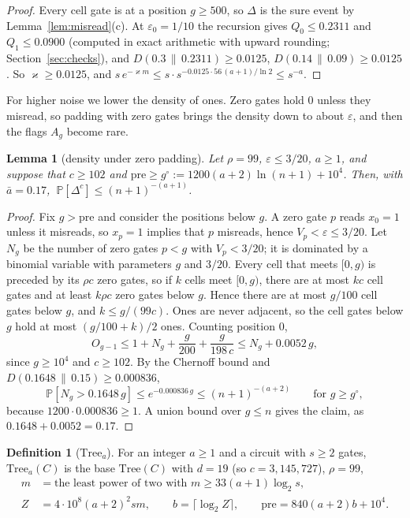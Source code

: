 \documentclass[11pt]{amsart}
\newtheorem{lemma}[theorem]{Lemma}
\theoremstyle{definition}
\newtheorem{definition}[theorem]{Definition}
\theoremstyle{remark}
\newcommand{\eps}{\varepsilon}
\newcommand{\PP}{\mathbb{P}}
\begin{document}
\begin{proof}
Every cell gate is at a position $g\ge500$, so $\Delta$ is the sure event by
Lemma~\ref{lem:misread}(c). At $\eps_0=1/10$ the recursion gives $Q_0\le0.2311$ and
$Q_1\le0.0900$ (computed in exact arithmetic with upward rounding; Section~\ref{sec:checks}), and
$D(0.3\,\|\,0.2311)\ge0.0125$, $D(0.14\,\|\,0.09)\ge0.0125$. So $\varkappa\ge0.0125$, and
$s\,e^{-\varkappa m}\le s\cdot s^{-0.0125\cdot56\,(a+1)/\ln2}\le s^{-a}$.
\end{proof}

For higher noise we lower the density of ones. Zero gates hold $0$ unless they misread, so padding
with zero gates brings the density down to about $\eps$, and then the flags $A_g$ become rare.

\begin{lemma}[density under zero padding]\label{lem:zeropad}
Let $\rho=99$, $\eps\le3/20$, $a\ge1$, and suppose that $c\ge102$ and
$\mathrm{pre}\ge g^\circ:=1200(a+2)\ln(n+1)+10^4$. Then, with $\bar a=0.17$,
$\ \PP[\Delta^c]\le(n+1)^{-(a+1)}$.
\end{lemma}

\begin{proof}
Fix $g>\mathrm{pre}$ and consider the positions below $g$. A zero gate $p$ reads $x_0=1$ unless it
misreads, so $x_p=1$ implies that $p$ misreads, hence $V_p<\eps\le3/20$. Let $N_g$ be the number of
zero gates $p<g$ with $V_p<3/20$; it is dominated by a binomial variable with parameters $g$ and
$3/20$. Every cell that meets $[0,g)$ is preceded by its $\rho c$ zero gates, so if $k$ cells meet
$[0,g)$, there are at most $kc$ cell gates and at least $k\rho c$ zero gates below $g$. Hence
there are at most $g/100$ cell gates below $g$, and $k\le g/(99c)$. Ones are never adjacent, so the
cell gates below $g$ hold at most $(g/100+k)/2$ ones. Counting position $0$,
\[
O_{g-1}\le1+N_g+\frac{g}{200}+\frac{g}{198\,c}\le N_g+0.0052\,g ,
\]
since $g\ge10^4$ and $c\ge102$. By the Chernoff bound and $D(0.1648\,\|\,0.15)\ge0.000836$,
\[
\PP[N_g>0.1648\,g]\le e^{-0.000836\,g}\le(n+1)^{-(a+2)}\qquad\text{for }g\ge g^\circ ,
\]
because $1200\cdot0.000836\ge1$. A union bound over $g\le n$ gives the claim, as
$0.1648+0.0052=0.17$.
\end{proof}

\begin{definition}[$\mathrm{Tree}_a$]\label{def:treea}
For an integer $a\ge1$ and a circuit with $s\ge2$ gates, $\mathrm{Tree}_a(C)$ is the base
$\mathrm{Tree}(C)$ with $d=19$ (so $c=3{,}145{,}727$), $\rho=99$,
\begin{align*}
m&=\text{the least power of two with }m\ge33(a+1)\log_2s,\\
Z&=4\cdot10^8(a+2)^2sm,\qquad b=\lceil\log_2Z\rceil,\qquad\mathrm{pre}=840(a+2)b+10^4 .
\end{align*}
\end{definition}
\end{document}
